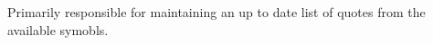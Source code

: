 \subsection{\FeedName}
Primarily responsible for maintaining an up to date list of quotes from the available symobls.
